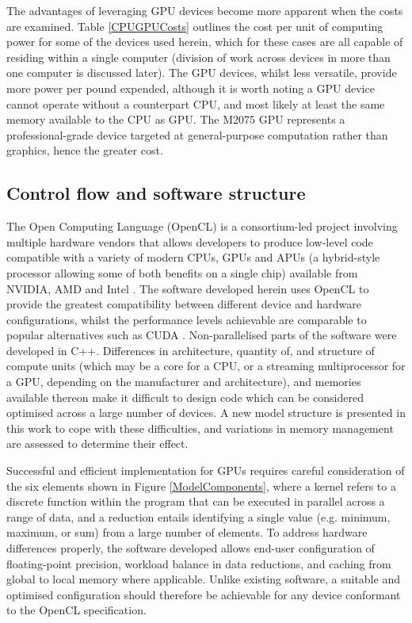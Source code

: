 The advantages of leveraging GPU devices become more apparent when the costs are examined. Table \ref{CPUGPUCosts} outlines the cost per unit of computing power for some of the devices used herein, which for these cases are all capable of residing within a single computer (division of work across devices in more than one computer is discussed later). The GPU devices, whilst less versatile, provide more power per pound expended, although it is worth noting a GPU device cannot operate without a counterpart CPU, and most likely at least the same memory available to the CPU as GPU. The M2075 GPU represents a professional-grade device targeted at general-purpose computation rather than graphics, hence the greater cost.

\subsection{Control flow and software structure}

The Open Computing Language (OpenCL) is a consortium-led project involving multiple hardware vendors that allows developers to produce low-level code compatible with a variety of modern CPUs, GPUs and APUs (a hybrid-style processor allowing some of both benefits on a single chip) available from NVIDIA, AMD and Intel \citep{KhronosOpenCLWorkingGroup2012,NVIDIACorporation2010,AdvancedMicroDevicesInc2011}. The software developed herein uses OpenCL to provide the greatest compatibility between different device and hardware configurations, whilst the performance levels achievable are comparable to popular alternatives such as CUDA \citep{Fang2011}. Non-parallelised parts of the software were developed in C++. Differences in architecture, quantity of, and structure of compute units (which may be a core for a CPU, or a streaming multiprocessor for a GPU, depending on the manufacturer and architecture), and memories available thereon make it difficult to design code which can be considered optimised across a large number of devices. A new model structure is presented in this work to cope with these difficulties, and variations in memory management are assessed to determine their effect.

Successful and efficient implementation for GPUs requires careful consideration of the six elements shown in Figure \ref{ModelComponents}, where a kernel refers to a discrete function within the program that can be executed in parallel across a range of data, and a reduction entails identifying a single value (e.g. minimum, maximum, or sum) from a large number of elements. To address hardware differences properly, the software developed allows end-user configuration of floating-point precision, workload balance in data reductions, and caching from global to local memory where applicable. Unlike existing software, a suitable and optimised configuration should therefore be achievable for any device conformant to the OpenCL specification.

